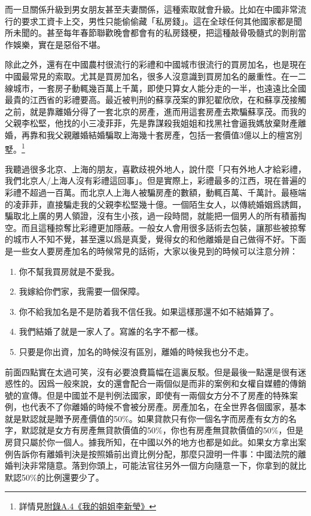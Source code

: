 而一旦關係升級到男女朋友甚至夫妻關係，這種索取就會升級。比如在中國非常流行的要求工資卡上交，男性只能偷偷藏「私房錢」。這在全球任何其他國家都是聞所未聞的。甚至每年春節聯歡晚會都會有的私房錢梗，把這種敲骨吸髓式的剝削當作娛樂，實在是惡俗不堪。

除此之外，還有在中國農村很流行的彩禮和中國城市很流行的買房加名，也是現在中國最常見的索取。尤其是買房加名，很多人沒意識到買房加名的嚴重性。在一二線城市，一套房子動輒幾百萬上千萬，即使只算女人能分走的一半，也遠遠比全國最貴的江西省的彩禮要高。最近被判刑的蘇享茂案的罪犯翟欣欣，在和蘇享茂接觸之前，就是靠離婚分得了一套北京的房產，進而用這套房產去欺騙蘇享茂。而我的父親李松堅，他找的小三凌菲菲，先是靠謀殺我姐姐和找黑社會逼我媽放棄財產離婚，再靠和我父親離婚結婚騙取上海幾十套房產，包括一套價值3億以上的檀宮別墅。\footnote{詳情見\hyperref[sister]{附錄A.4《我的姐姐李新瑩》}}

我聽過很多北京、上海的朋友，喜歡歧視外地人，說什麼「只有外地人才給彩禮，我們北京人/上海人沒有彩禮這回事」。但是實際上，彩禮最多的江西，現在普遍的彩禮不超過一百萬。而北京人上海人被騙房產的數額，動輒百萬、千萬計。最極端的凌菲菲，直接騙走我的父親李松堅幾十億。一個陌生女人，以傳統婚姻爲誘餌，騙取北上廣的男人領證，沒有生小孩，過一段時間，就能把一個男人的所有積蓄掏空。而且這種掠奪比彩禮更加隱蔽。一般女人會用很多話術去包裝，讓那些被掠奪的城市人不知不覺，甚至還以爲是真愛，覺得女的和他離婚是自己做得不好。下面是一些女人要房產加名的時候常見的話術，大家以後見到的時候可以注意分辨：
\begin{enumerate}
\item 你不幫我買房就是不愛我。
\item 我嫁給你們家，我需要一個保障。
\item 你不給我加名是不是防着我不信任我。如果這樣那還不如不結婚算了。
\item 我們結婚了就是一家人了。寫誰的名字不都一樣。
\item 只要是你出資，加名的時候沒有區別，離婚的時候我也分不走。
\end{enumerate}

前面四點實在太過可笑，沒有必要浪費篇幅在這裏反駁。但是最後一點還是很有迷惑性的。因爲一般來說，女的還會配合一兩個似是而非的案例和女權自媒體的傳銷號的宣傳。但是中國並不是判例法國家，即使有一兩個女方分不了房產的特殊案例，也代表不了你離婚的時候不會被分房產。房產加名，在全世界各個國家，基本就是默認就是贈予房產價值的50\%。如果貸款只有你一個名字而房產有女方的名字，默認就是女方有房產無貸款價值的50\%，你也有房產無貸款價值的50\%，但是房貸只屬於你一個人。據我所知，在中國以外的地方也都是如此。如果女方拿出案例告訴你有離婚判決是按照婚前出資比例分配，那麼只證明一件事：中國法院的離婚判決非常隨意。落到你頭上，可能法官往另外一個方向隨意一下，你拿到的就比默認50\%的比例還要少了。

